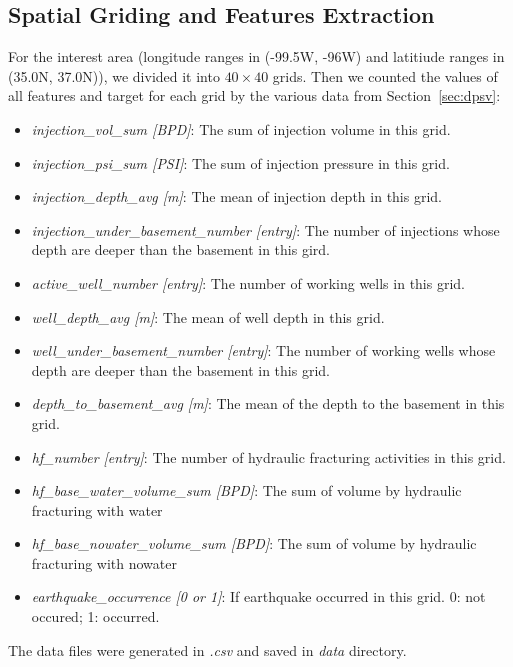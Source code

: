 \documentclass[final-report]{report-template}
\begin{document}
\subsection{Spatial Griding and Features Extraction}
For the interest area (longitude ranges in (-99.5W, -96W) and latitiude ranges in (35.0N, 37.0N)), we divided it into $40 \times 40$ grids. Then we counted the values of all features and target for each grid by the various data from Section~\ref{sec:dpsv}:
\begin{itemize}
    \item \textit{injection\_vol\_sum [BPD]}: The sum of injection volume in this grid.
    \item \textit{injection\_psi\_sum [PSI]}: The sum of injection pressure in this grid.
    \item \textit{injection\_depth\_avg [m]}: The mean of injection depth in this grid.
    \item \textit{injection\_under\_basement\_number [entry]}: The number of injections whose depth are deeper than the basement in this gird.
    \item \textit{active\_well\_number [entry]}: The number of working wells in this grid.
    \item \textit{well\_depth\_avg [m]}: The mean of well depth in this grid.
    \item \textit{well\_under\_basement\_number [entry]}: The number of working wells whose depth are deeper than the basement in this grid.
    \item \textit{depth\_to\_basement\_avg [m]}: The mean of the depth to the basement in this grid.
    \item \textit{hf\_number [entry]}: The number of hydraulic fracturing activities in this grid.
    \item \textit{hf\_base\_water\_volume\_sum [BPD]}: The sum of volume by hydraulic fracturing with water
    \item \textit{hf\_base\_nowater\_volume\_sum [BPD]}: The sum of volume by hydraulic fracturing with nowater
    \item \textit{earthquake\_occurrence [0 or 1]}: If earthquake occurred in this grid. 0: not occured; 1: occurred.
\end{itemize}
The data files were generated in \textit{.csv} and saved in \textit{data} directory.
\end{document}
